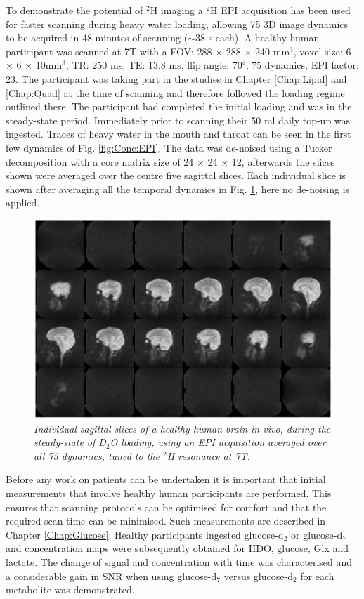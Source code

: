 To demonstrate the potential of $^2$H imaging a $^2$H \ac{EPI} acquisition has been used for faster scanning during heavy water loading, allowing 75 3D image dynamics to be acquired in 48 minutes of scanning ($\sim$38 s each). A healthy human participant was scanned at 7T with a \ac{FOV}: 288 $\times$ 288 $\times$ 240 mm$^3$, voxel size: 6 $\times$ 6 $\times$ 10mm$^3$, \ac{TR}: 250 ms, TE: 13.8 ms, flip angle: 70$^\circ$, 75 dynamics, \ac{EPI} factor: 23. The participant was taking part in the studies in Chapter \ref{Chap:Lipid} and \ref{Chap:Quad} at the time of scanning and therefore followed the loading regime outlined there. The participant had completed the initial loading and was in the steady-state period. Immediately prior to scanning their 50 ml daily top-up was ingested. Traces of heavy water in the mouth and throat can be seen in the first few dynamics of Fig. \ref{fig:Conc:EPI}. The data was de-noised using a Tucker decomposition with a core matrix size of 24 $\times$ 24 $\times$ 12, afterwards the slices shown were averaged over the centre five sagittal slices. Each individual slice is shown after averaging all the temporal dynamics in Fig. \ref{fig:Conc:EPI_avg}, here no de-noising is applied.

\begin{figure}[H]
    \centering
    \includegraphics[width=1\textwidth]{Figures/D2O/EPI_avg.png}
    \caption{\textit{Individual sagittal slices of a healthy human brain in vivo, during the steady-state of D$_2$O loading, using an \ac{EPI} acquisition averaged over all 75 dynamics, tuned to the $^2$H resonance at 7T.}}
    \label{fig:Conc:EPI_avg}
\end{figure}

Before any work on patients can be undertaken it is important that initial measurements that involve healthy human participants are performed. This ensures that scanning protocols can be optimised for comfort and that the required scan time can be minimised. Such measurements are described in Chapter \ref{Chap:Glucose}. Healthy participants ingested glucose-d$_2$ or glucose-d$_7$ and concentration maps were subsequently obtained for \ac{HDO}, glucose, Glx and lactate. The change of signal and concentration with time was characterised and a considerable gain in \ac{SNR} when using glucose-d$_7$ versus glucose-d$_2$ for each metabolite was demonstrated.

